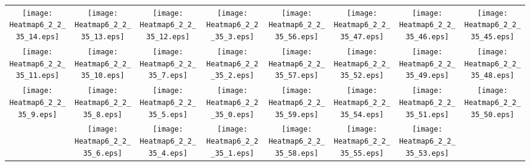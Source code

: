 \documentclass{standalone}
\begin{document}
\begin{tabular}{ *8{c} }
\texttt{[image: Heatmap6\_2\_2\_35\_14.eps]} & \texttt{[image: Heatmap6\_2\_2\_35\_13.eps]} & \texttt{[image: Heatmap6\_2\_2\_35\_12.eps]} & \texttt{[image: Heatmap6\_2\_2\_35\_3.eps]} & \texttt{[image: Heatmap6\_2\_2\_35\_56.eps]} & \texttt{[image: Heatmap6\_2\_2\_35\_47.eps]} & \texttt{[image: Heatmap6\_2\_2\_35\_46.eps]} & \texttt{[image: Heatmap6\_2\_2\_35\_45.eps]} \\
\texttt{[image: Heatmap6\_2\_2\_35\_11.eps]} & \texttt{[image: Heatmap6\_2\_2\_35\_10.eps]} & \texttt{[image: Heatmap6\_2\_2\_35\_7.eps]} & \texttt{[image: Heatmap6\_2\_2\_35\_2.eps]} & \texttt{[image: Heatmap6\_2\_2\_35\_57.eps]} & \texttt{[image: Heatmap6\_2\_2\_35\_52.eps]} & \texttt{[image: Heatmap6\_2\_2\_35\_49.eps]} & \texttt{[image: Heatmap6\_2\_2\_35\_48.eps]} \\
\texttt{[image: Heatmap6\_2\_2\_35\_9.eps]} & \texttt{[image: Heatmap6\_2\_2\_35\_8.eps]} & \texttt{[image: Heatmap6\_2\_2\_35\_5.eps]} & \texttt{[image: Heatmap6\_2\_2\_35\_0.eps]} & \texttt{[image: Heatmap6\_2\_2\_35\_59.eps]} & \texttt{[image: Heatmap6\_2\_2\_35\_54.eps]} & \texttt{[image: Heatmap6\_2\_2\_35\_51.eps]} & \texttt{[image: Heatmap6\_2\_2\_35\_50.eps]} \\
 & \texttt{[image: Heatmap6\_2\_2\_35\_6.eps]} & \texttt{[image: Heatmap6\_2\_2\_35\_4.eps]} & \texttt{[image: Heatmap6\_2\_2\_35\_1.eps]} & \texttt{[image: Heatmap6\_2\_2\_35\_58.eps]} & \texttt{[image: Heatmap6\_2\_2\_35\_55.eps]} & \texttt{[image: Heatmap6\_2\_2\_35\_53.eps]} &  
\end{tabular}
\end{document}
